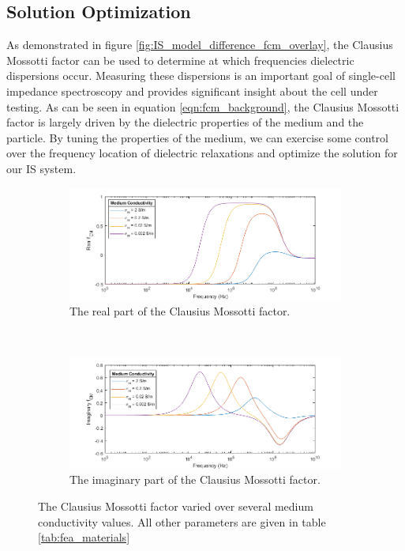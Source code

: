\FloatBarrier

\subsection{Solution Optimization}
\label{sec:solution_optimization}

\par As demonstrated in figure \ref{fig:IS_model_difference_fcm_overlay}, the Clausius Mossotti factor can be used to determine at which frequencies dielectric dispersions occur. Measuring these dispersions is an important goal of single-cell impedance spectroscopy and provides significant insight about the cell under testing. As can be seen in equation \ref{eqn:fcm_background}, the Clausius Mossotti factor is largely driven by the dielectric properties of the medium and the particle. By tuning the properties of the medium, we can exercise some control over the frequency location of dielectric relaxations and optimize the solution for our IS system. 

\begin{figure}[h]
    \centering
    \begin{subfigure}[b]{\textwidth}
        \centering
        \includegraphics[width=\textwidth]{images/realFCMvsConductvity.png}
        \caption{The real part of the Clausius Mossotti factor.}
        \label{}
    \end{subfigure}
    \\
    \vspace{0.1 in}
    \begin{subfigure}[b]{\textwidth}
        \centering
        \includegraphics[width=\textwidth]{images/imaginaryFCMvsConductvity.png}
        \caption{The imaginary part of the Clausius Mossotti factor.}
    \end{subfigure}
    \caption[The Clausius Mossotti factor varied over several medium conductivity values.]{The Clausius Mossotti factor varied over several medium conductivity values. All other parameters are given in table \ref{tab:fea_materials}}
    \label{fig:solutionConductivityOptimizeFCM}
\end{figure}


